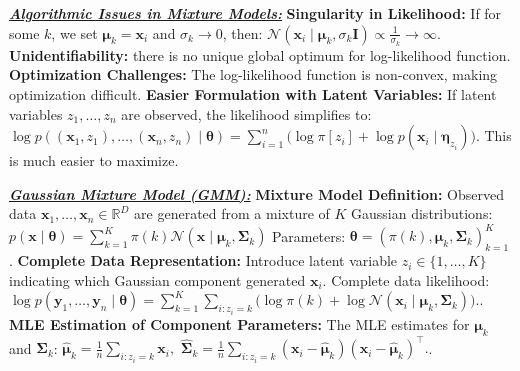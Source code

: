 \documentclass[10pt]{article}
\newcommand{\bulletPoint}[1]{\ul{\textit{\textbf{#1}}}}
\begin{document}
\begin{multicols*}{2}
\bulletPoint{Algorithmic Issues in Mixture Models:}\quad
\textbf{Singularity in Likelihood:} 
If for some $k$, we set $\boldsymbol{\mu}_k = \mathbf{x}_i$ and $\sigma_k \to 0$, then:
$\mathcal{N}(\mathbf{x}_i \mid \boldsymbol{\mu}_k, \sigma_k \mathbf{I}) \propto \frac{1}{\sigma_k} \to \infty$. 
\textbf{Unidentifiability:} 
there is no unique global optimum for log-likelihood function. 
\textbf{Optimization Challenges:} 
The log-likelihood function is non-convex, making optimization difficult. 
\textbf{Easier Formulation with Latent Variables:}
If latent variables $z_1, \dots, z_n$ are observed, the likelihood simplifies to:
$\log p((\mathbf{x}_1, z_1), \dots, (\mathbf{x}_n, z_n) \mid \boldsymbol{\theta}) = \sum_{i=1}^{n} \big( \log \pi[z_i] + \log p(\mathbf{x}_i \mid \boldsymbol{\eta}_{z_i}) \big)$.
This is much easier to maximize.


\bulletPoint{Gaussian Mixture Model (GMM):}\quad
\textbf{Mixture Model Definition:}
Observed data $\mathbf{x}_1, \dots, \mathbf{x}_n \in \mathbb{R}^{D}$ are generated from a mixture of $K$ Gaussian distributions:
$p(\mathbf{x} \mid \boldsymbol{\theta}) = \sum_{k=1}^{K} \pi(k) \mathcal{N} (\mathbf{x} \mid \boldsymbol{\mu}_k, \boldsymbol{\Sigma}_k)$
Parameters: $\boldsymbol{\theta} = (\pi(k), \boldsymbol{\mu}_k, \boldsymbol{\Sigma}_k)_{k=1}^{K}$. 
\textbf{Complete Data Representation:}
Introduce latent variable $z_i \in \{1, \dots, K\}$ indicating which Gaussian component generated $\mathbf{x}_i$.
Complete data likelihood:
$\log p(\mathbf{y}_1, \dots, \mathbf{y}_n \mid \boldsymbol{\theta}) = \sum_{k=1}^{K} \sum_{i: z_i = k} \big( \log \pi(k) + \log \mathcal{N} (\mathbf{x}_i \mid \boldsymbol{\mu}_k, \boldsymbol{\Sigma}_k) \big).$. 
\textbf{MLE Estimation of Component Parameters:}
The MLE estimates for $\boldsymbol{\mu}_k$ and $\boldsymbol{\Sigma}_k$:
$ \hat{\boldsymbol{\mu}}_k = \frac{1}{n} \sum_{i: z_i = k} \mathbf{x}_i, $ $ \hat{\boldsymbol{\Sigma}}_k = \frac{1}{n} \sum_{i: z_i = k} (\mathbf{x}_i - \hat{\boldsymbol{\mu}}_k)(\mathbf{x}_i - \hat{\boldsymbol{\mu}}_k)^{\top}. $. 


\end{multicols*}
\end{document}
